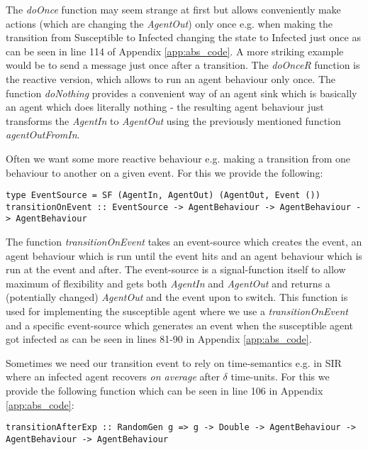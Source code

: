 The \textit{doOnce} function may seem strange at first but allows conveniently make actions (which are changing the \textit{AgentOut}) only once e.g. when making the transition from Susceptible to Infected changing the state to Infected just once as can be seen in line 114 of Appendix \ref{app:abs_code}. A more striking example would be to send a message just once after a transition. The \textit{doOnceR} function is the reactive version, which allows to run an agent behaviour only once. The function \textit{doNothing} provides a convenient way of an agent sink which is basically an agent which does literally nothing - the resulting agent behaviour just transforms the \textit{AgentIn} to \textit{AgentOut} using the previously mentioned function \textit{agentOutFromIn}.

Often we want some more reactive behaviour e.g. making a transition from one behaviour to another on a given event. For this we provide the following:

\begin{verbatim}
type EventSource = SF (AgentIn, AgentOut) (AgentOut, Event ())
transitionOnEvent :: EventSource -> AgentBehaviour -> AgentBehaviour -> AgentBehaviour
\end{verbatim}

The function \textit{transitionOnEvent} takes an event-source which creates the event, an agent behaviour which is run until the event hits and an agent behaviour which is run at the event and after. The event-source is a signal-function itself to allow maximum of flexibility and gets both \textit{AgentIn} and \textit{AgentOut} and returns a (potentially changed) \textit{AgentOut} and the event upon to switch. 
This function is used for implementing the susceptible agent where we use a \textit{transitionOnEvent} and a specific event-source which generates an event when the susceptible agent got infected as can be seen in lines 81-90 in Appendix \ref{app:abs_code}.

Sometimes we need our transition event to rely on time-semantics e.g. in SIR where an infected agent recovers \textit{on average} after $\delta$ time-units. For this we provide the following function which can be seen in line 106 in Appendix \ref{app:abs_code}:

\begin{verbatim}
transitionAfterExp :: RandomGen g => g -> Double -> AgentBehaviour -> AgentBehaviour -> AgentBehaviour
\end{verbatim}

